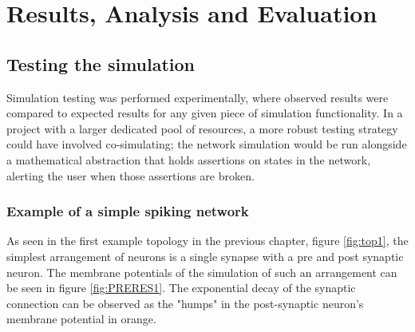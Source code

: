 \chapter{Results, Analysis and Evaluation}

\setlength{\epigraphwidth}{0.43\textwidth}

\section{Testing the simulation}

Simulation testing was performed experimentally, where observed results were
compared to expected results for any given piece of simulation functionality. In
a project with a larger dedicated pool of resources, 
a more robust testing strategy could have involved co-simulating; the
network simulation would be run alongside a mathematical abstraction that holds
assertions on states in the network, alerting the user when those assertions
are broken.

\subsection{Example of a simple spiking network}

As seen in the first example topology in the previous chapter, figure
\ref{fig:top1}, the simplest arrangement of neurons is a single synapse with a
pre and post synaptic neuron. The membrane potentials of the simulation of such
an arrangement can be seen in figure \ref{fig:PRERES1}. The exponential decay of
the synaptic connection can be observed as the "humps" in the post-synaptic
neuron's membrane potential in orange.

